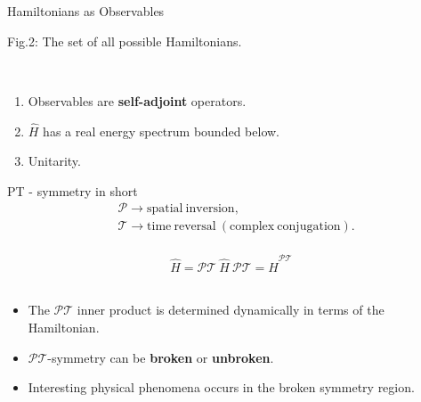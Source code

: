 \documentclass[10pt]{beamer}
\begin{document}
\begin{frame}{Hamiltonians as Observables}
    \\
    \hspace{1em}
    \begin{tiny}
        Fig.2: The set of all possible Hamiltonians.
    \end{tiny}
    \\
    \begin{enumerate}
        \item \textcolor{myNewColorA}{Observables are \textbf{self-adjoint} operators.}
        \item \textcolor{myNewColorC}{$\hat{H}$ has a real energy spectrum bounded below.}
        \item \textcolor{myNewColorC}{Unitarity.}
    \end{enumerate}
\end{frame}

\begin{frame}{PT - symmetry in short}
    \vspace{-1cm}
    \begin{align*}
        & \mathcal{P} \rightarrow \mathrm{spatial\:inversion},\\
        & \mathcal{T} \rightarrow \mathrm{time\:reversal\:(complex\: conjugation)}.
    \end{align*}\\
    \vspace{0.5cm}
    \begin{equation*}
    \hat{H} = \mathcal{PT}\:\hat{H}\:\mathcal{PT} = \hat{H}^{\mathcal{PT}} 
    \end{equation*}\\
    \vspace{0.5cm}
    \pause
    \begin{itemize}
    \item The $\mathcal{PT}$ inner product is determined dynamically in terms of the Hamiltonian.\\
    \pause
    \item $\mathcal{PT}$-symmetry can be \textbf{broken} or \textbf{unbroken}.
    \pause
    \item Interesting physical phenomena occurs in the broken symmetry region.
    \end{itemize}
\end{frame}
\end{document}
